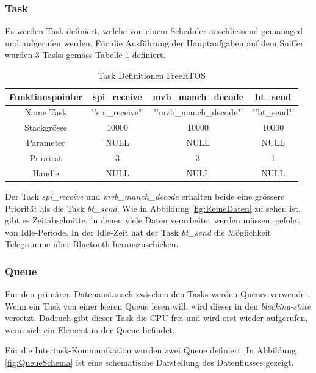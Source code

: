 \subsubsection{Task}
Es werden Task definiert, welche von einem Scheduler anschliessend gemanaged und aufgerufen werden. Für die Ausführung der Hauptaufgaben auf dem Sniffer wurden 3 Tasks gemäss Tabelle \ref{tab:TaskDefinitonen} definiert.

\begin{table}[H]
    \centering
    \begin{tabular}{|c||c|c|c|}
        \hline
        Funktionspointer & spi\_receive  & mvb\_manch\_decode & bt\_send\\ 
        \hline
        Name Task  & "'spi\_receive"' & "'mvb\_manch\_decode"' & "'bt\_send"'\\ 
        \hline
        Stackgrösse & 10000 & 10000 & 10000\\ 
        \hline
        Parameter & NULL & NULL & NULL\\ 
        \hline
        Priorität & 3 & 3 & 1\\ 
        \hline
        Handle & NULL & NULL & NULL\\ 
        \hline
    \end{tabular}
    \caption{Task Definitionen FreeRTOS}
    \label{tab:TaskDefinitonen}
\end{table}

Der Task \textit{spi\_receive} und \textit{mvb\_manch\_decode} erhalten beide eine grössere Priorität als die Task \textit{bt\_send}. Wie in Abbildung \ref{fig:ReineDaten} zu sehen ist, gibt es Zeitabschnitte, in denen viele Daten verarbeitet werden müssen, gefolgt von Idle-Periode. In der Idle-Zeit hat der Task \textit{bt\_send} die Möglichkeit Telegramme über Bluetooth herauszuschicken.


\subsubsection{Queue}
\label{subsub:Queue}
Für den primären Datenaustausch zwischen den Tasks werden Queues verwendet. Wenn ein Task von einer leeren Queue lesen will, wird dieser in den \textit{blocking-state} versetzt. Dadruch gibt dieser Task die CPU frei und wird erst wieder aufgerufen, wenn sich ein Element in der Queue befindet.\cite{FREERTOS_QUEUE}

Für die Intertask-Kommunikation wurden zwei Queue definiert. In Abbildung \ref{fig:QueueSchema} ist eine schematische Darstellung des Datenflusses gezeigt.


